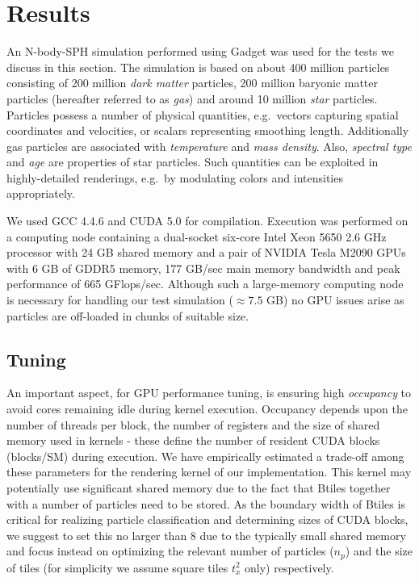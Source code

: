 \documentclass[smallextended]{svjour3}
\begin{document}
\section{Results}
\label{sec:results}

An N-body-SPH simulation performed using Gadget \cite{gadgeturl} was used for the tests we discuss in this section. The simulation is based on about 400 million particles consisting of 200 million {\it dark matter} particles, 200 million baryonic matter particles (hereafter referred to as {\it gas}) and around 10 million {\it star} particles. Particles possess a number of physical quantities, e.g.\ vectors capturing spatial coordinates and velocities, or scalars representing smoothing length. Additionally gas particles are associated with {\it temperature} and {\it mass density}. Also, {\it spectral type} and {\it age} are properties of star particles. Such quantities can be exploited in highly-detailed renderings, e.g.\ by modulating colors and intensities appropriately. 

We used GCC 4.4.6 and CUDA 5.0 for compilation. Execution was performed on a computing node containing a dual-socket six-core Intel Xeon 5650 2.6 GHz processor with 24 GB shared memory and a pair of NVIDIA Tesla M2090 GPUs with 6 GB of GDDR5 memory, 177 GB/sec main memory bandwidth and peak performance of 665 GFlops/sec. Although such a large-memory computing node is necessary for handling our test simulation ($\approx 7.5$ GB) no GPU issues arise as particles are off-loaded in chunks of suitable size. 

\subsection{Tuning}
\label{sec:gpuperf}
An important aspect, for GPU performance tuning, is ensuring high {\it occupancy} to avoid cores remaining idle during kernel execution. Occupancy depends upon the number of threads per block, the number of registers and the size of shared memory used in kernels - these define the number of resident CUDA blocks (blocks/SM) during execution. We have empirically estimated a trade-off among these parameters for the rendering kernel of our implementation. This kernel may potentially use significant shared memory due to the fact that Btiles together with a number of particles need to be stored. As the boundary width of Btiles is critical for realizing particle classification and determining sizes of CUDA blocks, we suggest to set this no larger than 8 due to the typically small shared memory and focus instead on optimizing the relevant number of particles ($n_p$) and the size of tiles (for simplicity we assume square tiles $t_x^2$ only) respectively.
\end{document}
